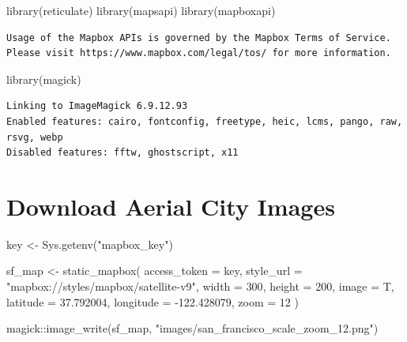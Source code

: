 \documentclass[
  letterpaper,
  DIV=11,
  numbers=noendperiod]{scrreprt}
\newenvironment{Shaded}{\begin{snugshade}}{\end{snugshade}}
\newcommand{\AttributeTok}[1]{\textcolor[rgb]{0.40,0.45,0.13}{#1}}
\newcommand{\DecValTok}[1]{\textcolor[rgb]{0.68,0.00,0.00}{#1}}
\newcommand{\FloatTok}[1]{\textcolor[rgb]{0.68,0.00,0.00}{#1}}
\newcommand{\FunctionTok}[1]{\textcolor[rgb]{0.28,0.35,0.67}{#1}}
\newcommand{\NormalTok}[1]{\textcolor[rgb]{0.00,0.23,0.31}{#1}}
\newcommand{\OtherTok}[1]{\textcolor[rgb]{0.00,0.23,0.31}{#1}}
\newcommand{\SpecialCharTok}[1]{\textcolor[rgb]{0.37,0.37,0.37}{#1}}
\newcommand{\StringTok}[1]{\textcolor[rgb]{0.13,0.47,0.30}{#1}}
\begin{document}
\begin{Shaded}
\begin{Highlighting}[]
\FunctionTok{library}\NormalTok{(reticulate)}
\FunctionTok{library}\NormalTok{(mapsapi)}
\FunctionTok{library}\NormalTok{(mapboxapi)}
\end{Highlighting}
\end{Shaded}

\begin{verbatim}
Usage of the Mapbox APIs is governed by the Mapbox Terms of Service.
Please visit https://www.mapbox.com/legal/tos/ for more information.
\end{verbatim}

\begin{Shaded}
\begin{Highlighting}[]
\FunctionTok{library}\NormalTok{(magick)}
\end{Highlighting}
\end{Shaded}

\begin{verbatim}
Linking to ImageMagick 6.9.12.93
Enabled features: cairo, fontconfig, freetype, heic, lcms, pango, raw, rsvg, webp
Disabled features: fftw, ghostscript, x11
\end{verbatim}

\hypertarget{download-aerial-city-images}{%
\section{Download Aerial City
Images}\label{download-aerial-city-images}}

\begin{Shaded}
\begin{Highlighting}[]
\NormalTok{key }\OtherTok{\textless{}{-}} \FunctionTok{Sys.getenv}\NormalTok{(}\StringTok{"mapbox\_key"}\NormalTok{)}
\end{Highlighting}
\end{Shaded}

\begin{Shaded}
\begin{Highlighting}[]
\NormalTok{sf\_map }\OtherTok{\textless{}{-}} \FunctionTok{static\_mapbox}\NormalTok{(}
  \AttributeTok{access\_token =}\NormalTok{ key,}
  \AttributeTok{style\_url =} \StringTok{"mapbox://styles/mapbox/satellite{-}v9"}\NormalTok{,}
  \AttributeTok{width =} \DecValTok{300}\NormalTok{,}
  \AttributeTok{height =} \DecValTok{200}\NormalTok{, }
  \AttributeTok{image =}\NormalTok{ T, }\AttributeTok{latitude =} \FloatTok{37.792004}\NormalTok{, }\AttributeTok{longitude =} \SpecialCharTok{{-}}\FloatTok{122.428079}\NormalTok{, }\AttributeTok{zoom =} \DecValTok{12}
\NormalTok{)}

\NormalTok{magick}\SpecialCharTok{::}\FunctionTok{image\_write}\NormalTok{(sf\_map, }\StringTok{"images/san\_francisco\_scale\_zoom\_12.png"}\NormalTok{)}
\end{Highlighting}
\end{Shaded}
\end{document}
